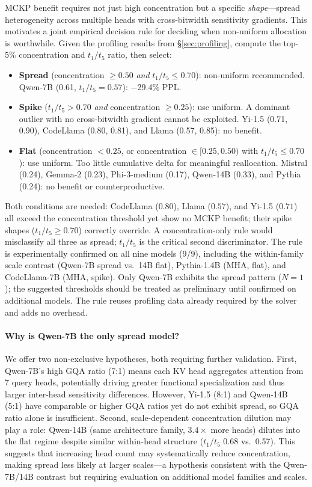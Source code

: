 MCKP benefit requires not just high concentration but a specific \emph{shape}---spread heterogeneity across multiple heads with cross-bitwidth sensitivity gradients.
This motivates a joint empirical decision rule for deciding when non-uniform allocation is worthwhile.
Given the profiling results from \S\ref{sec:profiling}, compute the top-5\% concentration and $t_1/t_5$ ratio, then select:
\begin{itemize}[nosep]
\item \textbf{Spread} (concentration $\geq 0.50$ \emph{and} $t_1/t_5 \leq 0.70$): non-uniform recommended. Qwen-7B (0.61, $t_1/t_5{=}0.57$): $-$29.4\% PPL.
\item \textbf{Spike} ($t_1/t_5 > 0.70$ \emph{and} concentration $\geq 0.25$): use uniform. A dominant outlier with no cross-bitwidth gradient cannot be exploited. Yi-1.5 (0.71, 0.90), CodeLlama (0.80, 0.81), and Llama (0.57, 0.85): no benefit.
\item \textbf{Flat} (concentration $< 0.25$, or concentration $\in [0.25, 0.50)$ with $t_1/t_5 \leq 0.70$): use uniform. Too little cumulative delta for meaningful reallocation. Mistral (0.24), Gemma-2 (0.23), Phi-3-medium (0.17), Qwen-14B (0.33), and Pythia (0.24): no benefit or counterproductive.
\end{itemize}

Both conditions are needed: CodeLlama ($0.80$), Llama ($0.57$), and Yi-1.5 ($0.71$) all exceed the concentration threshold yet show no MCKP benefit; their spike shapes ($t_1/t_5 \geq 0.70$) correctly override.
A concentration-only rule would misclassify all three as spread; $t_1/t_5$ is the critical second discriminator.
The rule is experimentally confirmed on all nine models (9/9), including the within-family scale contrast (Qwen-7B spread vs.\ 14B flat), Pythia-1.4B (MHA, flat), and CodeLlama-7B (MHA, spike).
Only Qwen-7B exhibits the spread pattern ($N{=}1$); the suggested thresholds should be treated as preliminary until confirmed on additional models.
The rule reuses profiling data already required by the solver and adds no overhead.

\paragraph{Why is Qwen-7B the only spread model?}
We offer two non-exclusive hypotheses, both requiring further validation.
First, Qwen-7B's high GQA ratio (7:1) means each KV head aggregates attention from 7 query heads, potentially driving greater functional specialization and thus larger inter-head sensitivity differences.
However, Yi-1.5 (8:1) and Qwen-14B (5:1) have comparable or higher GQA ratios yet do not exhibit spread, so GQA ratio alone is insufficient.
Second, scale-dependent concentration dilution may play a role: Qwen-14B (same architecture family, $3.4\times$ more heads) dilutes into the flat regime despite similar within-head structure ($t_1/t_5$ 0.68 vs.\ 0.57).
This suggests that increasing head count may systematically reduce concentration, making spread less likely at larger scales---a hypothesis consistent with the Qwen-7B/14B contrast but requiring evaluation on additional model families and scales.

